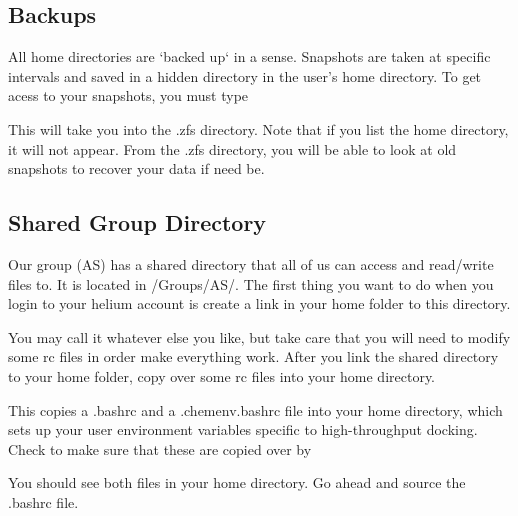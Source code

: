 \subsection{Backups}

All home directories are `backed up` in a sense. Snapshots are taken at specific intervals and saved in a hidden directory in the user's home directory. To get acess to your snapshots, you must type 
\begin{quote}
\end{quote}

This will take you into the .zfs directory. Note that if you list the home directory, it will not appear. From the .zfs directory, you will be able to look at old snapshots to recover your data if need be.

\subsection{Shared Group Directory}

Our group (AS) has a shared directory that all of us can access and read/write files to. It is located in /Groups/AS/. The first thing you want to do when you login to your helium account is create a link in your home folder to this directory. 

\begin{quote}
\end{quote}

You may call it whatever else you like, but take care that you will need to modify some rc files in order make everything work. After you link the shared directory to your home folder, copy over some rc files into your home directory.

\begin{quote}
\end{quote}

This copies a .bashrc and a .chemenv.bashrc file into your home directory, which sets up your user environment variables specific to high-throughput docking. Check to make sure that these are copied over by 

\begin{quote}
\end{quote}

You should see both files in your home directory. Go ahead and source the .bashrc file.

\begin{quote}
\end{quote}





